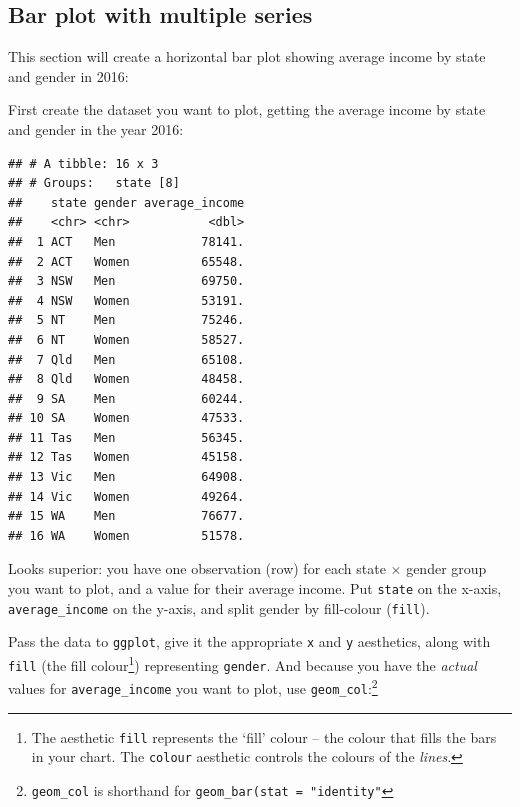 \documentclass[]{book}
\newenvironment{Shaded}{\begin{snugshade}}{\end{snugshade}}
\newcommand{\DataTypeTok}[1]{\textcolor[rgb]{0.13,0.29,0.53}{#1}}
\newcommand{\DecValTok}[1]{\textcolor[rgb]{0.00,0.00,0.81}{#1}}
\newcommand{\KeywordTok}[1]{\textcolor[rgb]{0.13,0.29,0.53}{\textbf{#1}}}
\newcommand{\NormalTok}[1]{#1}
\newcommand{\OperatorTok}[1]{\textcolor[rgb]{0.81,0.36,0.00}{\textbf{#1}}}
\newcommand{\StringTok}[1]{\textcolor[rgb]{0.31,0.60,0.02}{#1}}
\let\rmarkdownfootnote\footnote%
\def\footnote{\protect\rmarkdownfootnote}
\begin{document}
\hypertarget{bar-multi}{%
\subsection{Bar plot with multiple series}\label{bar-multi}}

This section will create a horizontal bar plot showing average income by state and gender in 2016:

First create the dataset you want to plot, getting the average income by state and gender in the year 2016:

\begin{Shaded}
\end{Shaded}

\begin{verbatim}
## # A tibble: 16 x 3
## # Groups:   state [8]
##    state gender average_income
##    <chr> <chr>           <dbl>
##  1 ACT   Men            78141.
##  2 ACT   Women          65548.
##  3 NSW   Men            69750.
##  4 NSW   Women          53191.
##  5 NT    Men            75246.
##  6 NT    Women          58527.
##  7 Qld   Men            65108.
##  8 Qld   Women          48458.
##  9 SA    Men            60244.
## 10 SA    Women          47533.
## 11 Tas   Men            56345.
## 12 Tas   Women          45158.
## 13 Vic   Men            64908.
## 14 Vic   Women          49264.
## 15 WA    Men            76677.
## 16 WA    Women          51578.
\end{verbatim}

Looks superior: you have one observation (row) for each state \(\times\) gender group you want to plot, and a value for their average income. Put \texttt{state} on the x-axis, \texttt{average\_income} on the y-axis, and split gender by fill-colour (\texttt{fill}).

Pass the data to \texttt{ggplot}, give it the appropriate \texttt{x} and \texttt{y} aesthetics, along with \texttt{fill} (the fill colour\footnote{The aesthetic \texttt{fill} represents the `fill' colour -- the colour that fills the bars in your chart. The \texttt{colour} aesthetic controls the colours of the \emph{lines}.}) representing \texttt{gender}. And because you have the \emph{actual} values for \texttt{average\_income} you want to plot, use \texttt{geom\_col}:\footnote{\texttt{geom\_col} is shorthand for \texttt{geom\_bar(stat\ =\ "identity"}}
\end{document}
